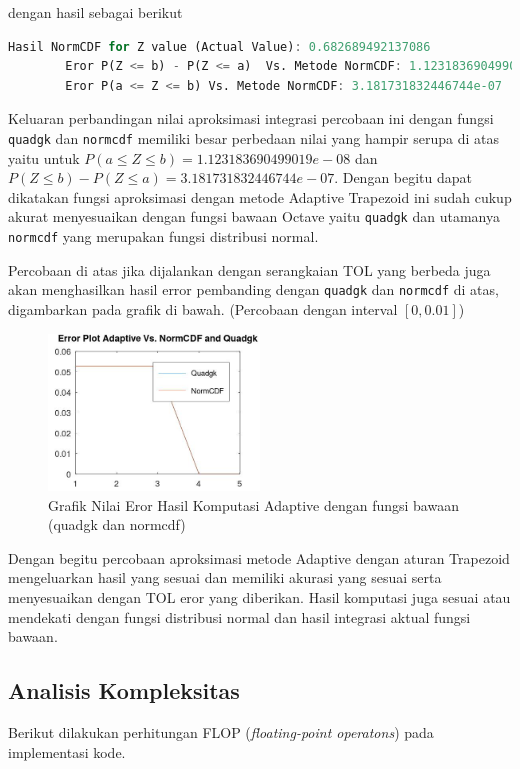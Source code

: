 \documentclass[journal,12pt,onecolumn,a4paper]{IEEEtran}
\begin{document}
dengan hasil sebagai berikut

\begin{center}
	\begin{lstlisting}[language=Octave]
		Hasil NormCDF for Z value (Actual Value): 0.682689492137086
		Eror P(Z <= b) - P(Z <= a)  Vs. Metode NormCDF: 1.123183690499019e-08
		Eror P(a <= Z <= b) Vs. Metode NormCDF: 3.181731832446744e-07
	\end{lstlisting}
\end{center}

Keluaran perbandingan nilai aproksimasi integrasi percobaan ini dengan fungsi \lstinline{quadgk} dan \lstinline{normcdf} memiliki besar perbedaan nilai
yang hampir serupa di atas yaitu untuk \(P(a \le Z \le b)= 1.123183690499019e-08\)  dan \(P(Z \le b ) - P(Z \le a ) = 3.181731832446744e-07\).
Dengan begitu dapat dikatakan fungsi aproksimasi dengan metode
Adaptive Trapezoid ini sudah cukup akurat menyesuaikan dengan fungsi bawaan Octave yaitu \lstinline{quadgk} dan utamanya \lstinline{normcdf} yang merupakan fungsi distribusi normal.

Percobaan di atas jika dijalankan dengan serangkaian TOL yang berbeda juga akan menghasilkan hasil error pembanding dengan \lstinline{quadgk} dan \lstinline{normcdf} di atas, digambarkan pada grafik di bawah.
(Percobaan dengan interval \([0,0.01]\))
\begin{figure}[h]
	\centering
	\includegraphics[width=0.5\textwidth]{trapezoid graf.jpg}
	\caption{Grafik Nilai Eror Hasil Komputasi Adaptive dengan fungsi bawaan (quadgk dan normcdf)}
	\label{fig:difGraphAdaptive}
\end{figure}

Dengan begitu percobaan aproksimasi metode Adaptive dengan aturan Trapezoid mengeluarkan hasil yang sesuai dan memiliki akurasi yang sesuai serta menyesuaikan dengan TOL eror yang diberikan. Hasil komputasi juga sesuai atau mendekati dengan fungsi distribusi normal dan hasil integrasi aktual fungsi bawaan.

\subsection{Analisis Kompleksitas}
Berikut dilakukan perhitungan FLOP (\emph{floating-point operatons}) pada implementasi kode.
\end{document}
